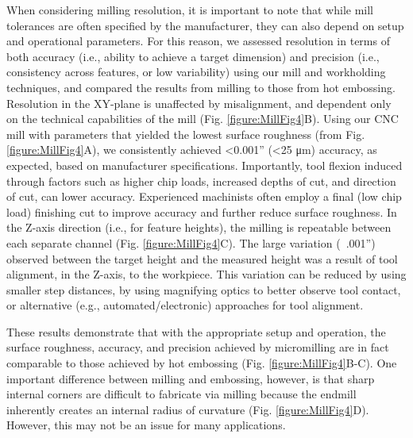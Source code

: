 {When considering milling resolution, it is important to note that while mill tolerances are often specified by the manufacturer, they can also depend on setup and operational parameters. For this reason, we assessed resolution in terms of both accuracy (i.e., ability to achieve a target dimension) and precision (i.e., consistency across features, or low variability) using our mill and workholding techniques, and compared the results from milling to those from hot embossing. Resolution in the XY-plane is unaffected by misalignment, and dependent only on the technical capabilities of the mill (Fig. \ref{figure:MillFig4}B). Using our CNC mill with parameters that yielded the lowest surface roughness (from Fig. \ref{figure:MillFig4}A), we consistently achieved <0.001” (<25 μm) accuracy, as expected, based on manufacturer specifications. Importantly, tool flexion induced through factors such as higher chip loads, increased depths of cut, and direction of cut, can lower accuracy. Experienced machinists often employ a final (low chip load) finishing cut to improve accuracy and further reduce surface roughness. In the Z-axis direction (i.e., for feature heights), the milling is repeatable between each separate channel (Fig. \ref{figure:MillFig4}C). The large variation (~.001”) observed between the target height and the measured height was a result of tool alignment, in the Z-axis, to the workpiece.  This variation can be reduced by using smaller step distances, by using magnifying optics to better observe tool contact, or alternative (e.g., automated/electronic) approaches for tool alignment. 

These results demonstrate that with the appropriate setup and operation, the surface roughness, accuracy, and precision achieved by micromilling are in fact comparable to those achieved by hot embossing (Fig. \ref{figure:MillFig4}B-C). One important difference between milling and embossing, however, is that sharp internal corners are difficult to fabricate via milling because the endmill inherently creates an internal radius of curvature (Fig. \ref{figure:MillFig4}D). However, this may not be an issue for many applications.

}
